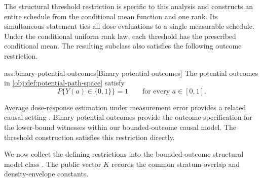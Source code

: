 The structural threshold restriction is specific to this analysis and constructs an entire schedule from the conditional mean function and one rank. Its simultaneous statement ties all dose evaluations to a single measurable schedule. Under the conditional uniform rank law, each threshold has the prescribed conditional mean. The resulting subclass also satisfies the following outcome restriction.

\begin{assumptionv}{ass:binary-potential-outcomes}[Binary potential outcomes]
The potential outcomes in \cref{obj:def:potential-path-space} satisfy
\[
P\{Y(a)\in\{0,1\}\}=1
\qquad
\text{for every }a\in[0,1].
\]
\end{assumptionv}

Average dose-response estimation under measurement error provides a related causal setting \citep{HuangZhang2023}. Binary potential outcomes provide the outcome specification for the lower-bound witnesses within our bounded-outcome causal model. The threshold construction satisfies this restriction directly.

We now collect the defining restrictions into the bounded-outcome structural model class . The public vector \(K\) records the common stratum-overlap and density-envelope constants.

